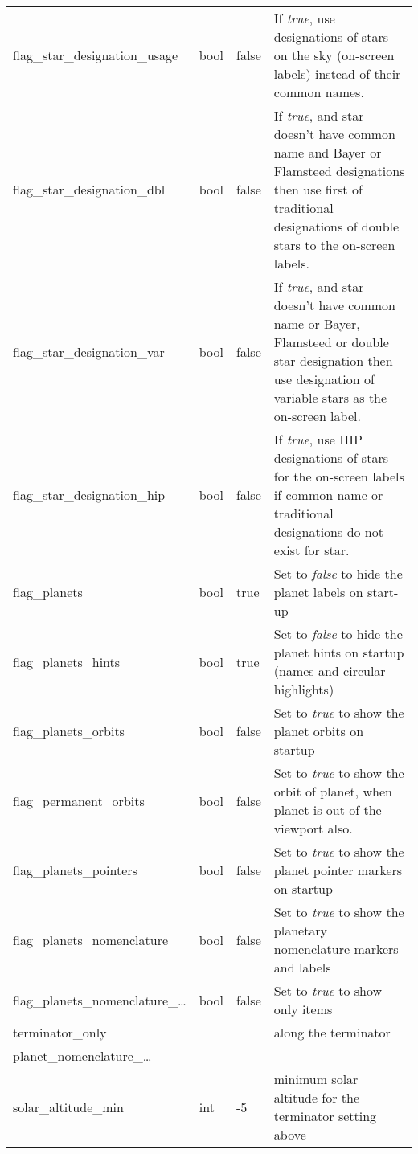 \begin{longtable}{l|l|l|p{55mm}}
%
flag\_star\_designation\_usage     & bool   & false & If \emph{true}, use designations of stars on the sky (on-screen labels) instead of their common names.\\
flag\_star\_designation\_dbl       & bool   & false & If \emph{true}, and star doesn't have common name and Bayer or Flamsteed designations then use first of traditional designations of double stars to the on-screen labels.\\
flag\_star\_designation\_var       & bool   & false & If \emph{true}, and star doesn't have common name or Bayer, Flamsteed or double star designation then use designation of variable stars as the on-screen label.\\
flag\_star\_designation\_hip       & bool   & false & If \emph{true}, use HIP designations of stars for the on-screen labels if common name or traditional designations do not exist for star.\\\midrule
%
flag\_planets                      & bool   & true  & Set to \emph{false} to hide the planet labels on start-up\\%
flag\_planets\_hints               & bool   & true  & Set to \emph{false} to hide the planet hints on startup (names and circular highlights)\\%
flag\_planets\_orbits              & bool   & false & Set to \emph{true} to show the planet orbits on startup\\%
flag\_permanent\_orbits            & bool   & false & Set to \emph{true} to show the orbit of planet, when planet is out of the viewport also.\\%
flag\_planets\_pointers            & bool   & false & Set to \emph{true} to show the planet pointer markers on startup\\%
flag\_planets\_nomenclature        & bool   & false & Set to \emph{true} to show the planetary nomenclature markers and labels\\%
flag\_planets\_nomenclature\_\ldots& bool   & false & Set to \emph{true} to show only items\\
\hspace{12mm}terminator\_only       &        &       & along the terminator\\
planet\_nomenclature\_\ldots       &        &       &\\
\hspace{12mm}solar\_altitude\_min   & int    & -5    & minimum solar altitude for the terminator setting above\\

\end{longtable}
